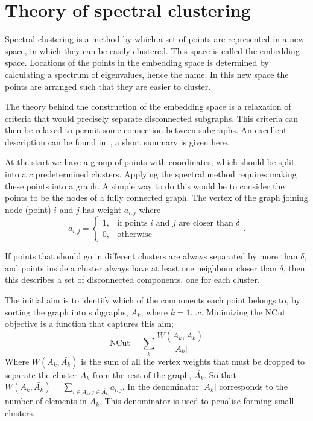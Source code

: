 \section{Theory of spectral clustering}\label{sec:spectral_theory}

Spectral clustering is a method by which a set of points are represented in a new space,
in which they can be easily clustered.
This space is called the embedding space.
Locations of the points in the embedding space is determined by calculating a
spectrum of eigenvalues, hence the name.
In this new space the points are arranged such that they are easier to cluster.

The theory behind the construction of the embedding space is a relaxation of criteria that would precisely
separate disconnected subgraphs.
This criteria can then be relaxed to permit some connection between subgraphs.
An excellent description can be found in~\cite{luxburg2007spectraltutorial}, a short summary is given here.

At the start we have a group of points with coordinates, which should be split into a \(c\) predetermined clusters.
Applying the spectral method requires making these points into a graph.
A simple way to do this would be to consider the points to be the nodes of a fully connected graph.
The vertex of the graph joining node (point) \(i\) and \(j\) has weight \(a_{i, j}\) where
\begin{equation}
    a_{i, j}= 
    \begin{cases}
        1, & \text{if points } i \text{ and } j \text{ are closer than } \delta \\
        0,              & \text{otherwise}
    \end{cases}
    .
\end{equation}

If points that should go in different clusters are always separated by more than \(\delta\),
and points inside a cluster always have at least one neighbour closer than \(\delta\),
then this describes a set of disconnected components, one for each cluster.

The initial aim is to identify which of the components each point belongs to,
by sorting the graph into subgraphs, \(A_k\), where \(k=1 \dots c\).
Minimizing the NCut objective is a function that captures this aim; 
\begin{equation}
    \text{NCut} = \sum_k\frac{W(A_k, \bar{A_k})}{|A_k|}
\end{equation}\label{eqn:cost_function}
Where \(W(A_k, \bar{A_k})\) is the sum of all the vertex weights that must be dropped
to separate the cluster \(A_k\) from the rest of the graph, \(\bar{A_k}\).
So that \( W(A_k, \bar{A_k}) = \sum_{i \in A_k, j \in \bar{A_k}} a_{i, j} \).
In the denominator \(|A_k|\) corresponds to the number of elements in \(A_k\).
This denominator is used to penalise forming small clusters.


